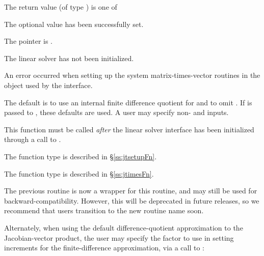 {{\begin{args}
  \end{args}
}
{
  The return value  (of type ) is one of
  \begin{args}
  \item[\Id{IDALS\_SUCCESS}]
    The optional value has been successfully set.
  \item[\Id{IDALS\_MEM\_NULL}]
    The  pointer is .
  \item[\Id{IDALS\_LMEM\_NULL}]
    The {\idals} linear solver has not been initialized.
  \item[\Id{IDALS\_SUNLS\_FAIL}]
    An error occurred when setting up the system matrix-times-vector
    routines in the {\sunlinsol} object used by the {\idals}
    interface.
  \end{args}
}
{
  The default is to use an internal finite difference quotient for
   and to omit .  If  is passed to
  , these defaults are used.  A user may specify
  non-  and   inputs.

  This function must be called \emph{after} the {\idals} linear solver
  interface has been initialized through a call to
  .

  The function type  is described in \S\ref{ss:jtsetupFn}.

  The function type  is described in \S\ref{ss:jtimesFn}.

  The previous routine  is now a wrapper for
  this routine, and may still be used for backward-compatibility.
  However, this will be deprecated in future releases, so we recommend
  that users transition to the new routine name soon.
}
Alternately, when using the default difference-quotient approximation
to the Jacobian-vector product, the user may specify the factor to
use in setting increments for the finite-difference approximation, via
a call to :

}
